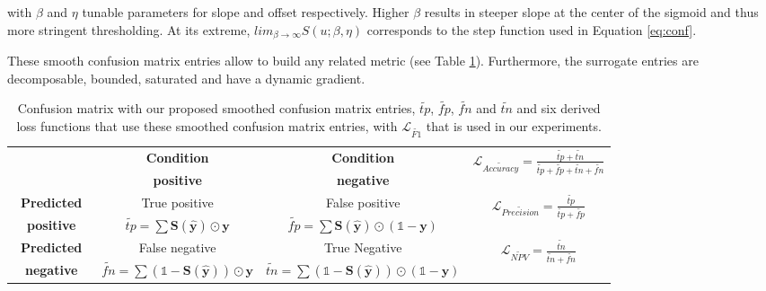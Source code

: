 with \(\beta\) and \(\eta\) tunable parameters for slope and offset respectively. Higher \(\beta\) results in steeper slope at the center of the sigmoid and thus more stringent thresholding. At its extreme, \(lim_{\beta\to\infty} S(u; \beta, \eta)\) corresponds to the step function used in Equation \ref{eq:conf}.


These smooth confusion matrix entries allow to build any related metric (see Table \ref{tab:confusion-matrix}). Furthermore, the surrogate entries are decomposable, bounded, saturated and have a dynamic gradient.

\begin{table}[]
\label{tab:confusion-matrix}
\caption{Confusion matrix with our proposed smoothed confusion matrix entries, $\widetilde{\mathit{tp}}$, $\widetilde{\mathit{fp}}$, $\widetilde{\mathit{fn}}$ and $\widetilde{\mathit{tn}}$ and six derived loss functions that use these smoothed confusion matrix entries, with $\mathcal{L}_{\widetilde{\mathit{F1}}}$ that is used in our experiments.}
\def\arraystretch{1.1}
\begin{tabular}{|c||c|c||c|} \cline{2-4}
\multicolumn{1}{l|}{} & \textbf{Condition} & \textbf{Condition} & \multirow{2}{*}{$\mathcal{L}_{\widetilde{\mathit{Accuracy}}}= \frac{\widetilde{\mathit{tp}} + \widetilde{\mathit{tn}}}{\widetilde{\mathit{tp}} + \widetilde{\mathit{fp}} + \widetilde{\mathit{tn}} + \widetilde{\mathit{fn}}}$} \\
\multicolumn{1}{l|}{} & \textbf{positive} &  \textbf{negative} & \\ \hline \hline
\textbf{~Predicted~} & True positive & False positive & \multirow{2}{*}{$\mathcal{L}_{\widetilde{\mathit{Precision}}}= \frac{\widetilde{\mathit{tp}}}{\widetilde{\mathit{tp}} + \widetilde{\mathit{fp}}}$} \\
\textbf{positive} & $\widetilde{\mathit{tp}}=\sum \mathbf{S}(\hat{\mathbf{y}}) \odot \mathbf{y}$ & $\widetilde{\mathit{fp}}= \sum \mathbf{S}(\hat{\mathbf{y}}) \odot (\mathds{1} - \mathbf{y})$ & \\ \hline
\textbf{Predicted} & False negative & True Negative & \multirow{2}{*}{$\mathcal{L}_{\widetilde{\mathit{NPV}}}= \frac{\widetilde{\mathit{tn}}}{\widetilde{\mathit{tn}} + \widetilde{\mathit{fn}}}$} \\
\textbf{negative} & $\widetilde{\mathit{fn}}= \sum (\mathds{1} - \mathbf{S}(\hat{\mathbf{y}})) \odot \mathbf{y}$ & $\widetilde{\mathit{tn}}= \sum (\mathds{1} - \mathbf{S}(\hat{\mathbf{y}})) \odot (\mathds{1} - \mathbf{y})$ & \\ \hline \hline

\end{tabular}
\end{table}
